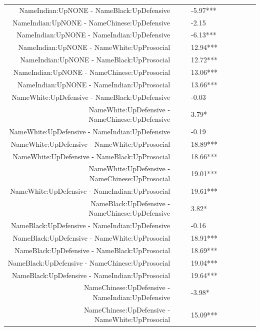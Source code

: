 \documentclass[]{report}
\begin{document}
\begin{table}[ht]
{\begin{tabular}{rllllllll}
		NameIndian:UpNONE - NameBlack:UpDefensive &  &  & -5.97*** &  &  &  &  &  \\ 
		NameIndian:UpNONE - NameChinese:UpDefensive &  &  & -2.15 &  &  &  &  &  \\ 
		NameIndian:UpNONE - NameIndian:UpDefensive &  &  & -6.13*** &  &  &  &  &  \\ 
		NameIndian:UpNONE - NameWhite:UpProsocial &  &  & 12.94*** &  &  &  &  &  \\ 
		NameIndian:UpNONE - NameBlack:UpProsocial &  &  & 12.72*** &  &  &  &  &  \\ 
		NameIndian:UpNONE - NameChinese:UpProsocial &  &  & 13.06*** &  &  &  &  &  \\ 
		NameIndian:UpNONE - NameIndian:UpProsocial &  &  & 13.66*** &  &  &  &  &  \\ 
		NameWhite:UpDefensive - NameBlack:UpDefensive &  &  & -0.03 &  &  &  &  &  \\ 
		NameWhite:UpDefensive - NameChinese:UpDefensive &  &  & 3.79* &  &  &  &  &  \\ 
		NameWhite:UpDefensive - NameIndian:UpDefensive &  &  & -0.19 &  &  &  &  &  \\ 
		NameWhite:UpDefensive - NameWhite:UpProsocial &  &  & 18.89*** &  &  &  &  &  \\ 
		NameWhite:UpDefensive - NameBlack:UpProsocial &  &  & 18.66*** &  &  &  &  &  \\ 
		NameWhite:UpDefensive - NameChinese:UpProsocial &  &  & 19.01*** &  &  &  &  &  \\ 
		NameWhite:UpDefensive - NameIndian:UpProsocial &  &  & 19.61*** &  &  &  &  &  \\ 
		NameBlack:UpDefensive - NameChinese:UpDefensive &  &  & 3.82* &  &  &  &  &  \\ 
		NameBlack:UpDefensive - NameIndian:UpDefensive &  &  & -0.16 &  &  &  &  &  \\ 
		NameBlack:UpDefensive - NameWhite:UpProsocial &  &  & 18.91*** &  &  &  &  &  \\ 
		NameBlack:UpDefensive - NameBlack:UpProsocial &  &  & 18.69*** &  &  &  &  &  \\ 
		NameBlack:UpDefensive - NameChinese:UpProsocial &  &  & 19.04*** &  &  &  &  &  \\ 
		NameBlack:UpDefensive - NameIndian:UpProsocial &  &  & 19.64*** &  &  &  &  &  \\ 
		NameChinese:UpDefensive - NameIndian:UpDefensive &  &  & -3.98* &  &  &  &  &  \\ 
		NameChinese:UpDefensive - NameWhite:UpProsocial &  &  & 15.09*** &  &  &  &  &  \\ 

\end{tabular}}
\end{table}
\end{document}
